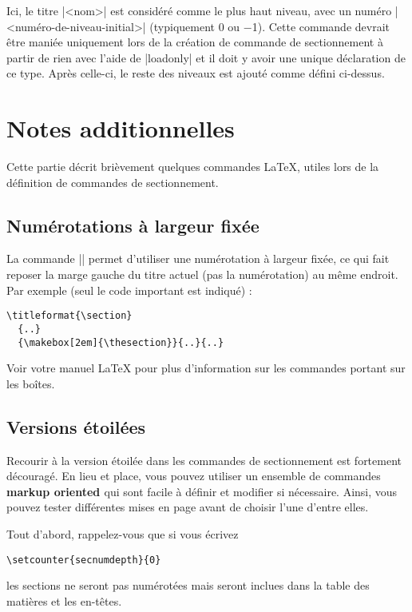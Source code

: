 \documentclass[a4paper]{ltxguide}
\newcommand{\trad}[1]{\textbf{\textcolor{orange5}{\noindent\ding{54} #1 \ding{54}}}}
\begin{document}
Ici, le titre |<nom>| est considéré comme le plus haut niveau, avec un
numéro |<numéro-de-niveau-initial>| (typiquement 0 ou $-$1). Cette commande devrait
être maniée uniquement lors de la création de commande de sectionnement à partir de
rien avec l'aide de |loadonly| et il doit y avoir une unique déclaration de ce type.
Après celle-ci, le reste des niveaux est ajouté comme défini ci-dessus.

\section{Notes additionnelles}

Cette partie décrit brièvement quelques commandes \LaTeX{}, utiles lors de la définition
de commandes de sectionnement.

\subsection{Numérotations à largeur fixée}

La commande |\makebox|  permet d'utiliser une numérotation à largeur fixée, ce qui
fait reposer la marge gauche du titre actuel (pas la numérotation) au même endroit.
Par exemple (seul le code important est indiqué) :
\begin{verbatim}
\titleformat{\section}
  {..}
  {\makebox[2em]{\thesection}}{..}{..}
\end{verbatim}

Voir votre manuel \LaTeX{} pour plus d'information sur les commandes portant sur les boîtes.

\subsection{Versions étoilées}
\label{s:starred}

Recourir à la version étoilée dans les commandes de sectionnement est fortement
découragé. En lieu et place, vous pouvez utiliser un ensemble de commandes \trad{markup
oriented} qui sont facile à définir et modifier si nécessaire. Ainsi, vous pouvez tester
différentes mises en page avant de choisir l'une d'entre elles.

Tout d'abord, rappelez-vous que si vous écrivez
\begin{verbatim}
\setcounter{secnumdepth}{0}
\end{verbatim}
les sections ne seront pas numérotées mais seront inclues dans la table des matières
et les en-têtes.
\end{document}
